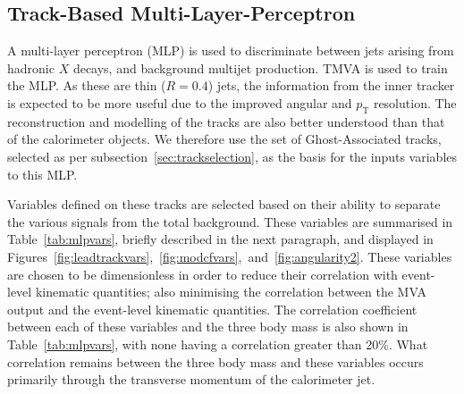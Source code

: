\documentclass[NOTE, atlasdraft=true, texlive=2017, UKenglish]{\ATLASLATEXPATH atlasdoc}
\begin{document}
\subsection{Track-Based Multi-Layer-Perceptron}
\label{sec:mlpselection}

A multi-layer perceptron (MLP) is used to discriminate between jets arising from hadronic $X$ decays, and background multijet production. \textsc{TMVA} is used to train the MLP. As these are thin ($R=0.4$) jets, the information from the inner tracker is expected to be more useful due to the improved angular and $p_\text{T}$ resolution. The reconstruction and modelling of the tracks are also better understood than that of the calorimeter objects. We therefore use the set of Ghost-Associated tracks, selected as per subsection~\ref{sec:trackselection}, as the basis for the inputs variables to this MLP.

Variables defined on these tracks are selected based on their ability to separate the various signals from the total background. These variables are summarised in Table~\ref{tab:mlpvars}, briefly described in the next paragraph, and displayed in Figures~\ref{fig:leadtrackvars},~\ref{fig:modcfvars},~and~\ref{fig:angularity2}. These variables are chosen to be dimensionless in order to reduce their correlation with event-level kinematic quantities; also minimising the correlation between the MVA output and the event-level kinematic quantities. The correlation coefficient between each of these variables and the three body mass is also shown in Table~\ref{tab:mlpvars}, with none having a correlation greater than 20\%. What correlation remains between the three body mass and these variables occurs primarily through the transverse momentum of the calorimeter jet.
\end{document}
